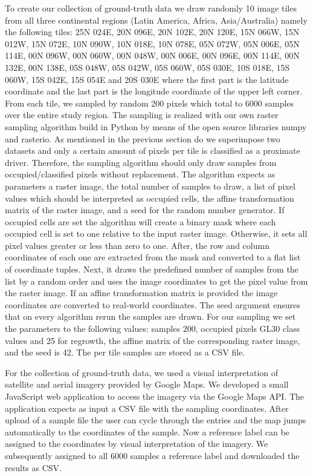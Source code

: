 			To create our collection of ground-truth data we draw randomly 10 image tiles from all three continental regions (Latin America, Africa, Asia/Australia) namely the following tiles: 25N 024E, 20N 096E, 20N 102E, 20N 120E, 15N 066W, 15N 012W, 15N 072E, 10N 090W, 10N 018E, 10N 078E, 05N 072W, 05N 006E, 05N 114E, 00N 096W, 00N 060W, 00N 048W, 00N 006E, 00N 096E, 00N 114E, 00N 132E, 00N 138E, 05S 048W, 05S 042W, 05S 060W, 05S 030E, 10S 018E, 15S 060W, 15S 042E, 15S 054E and 20S 030E where the first part is the latitude coordinate and the last part is the longitude coordinate of the upper left corner. From each tile, we sampled by random 200 pixels which total to 6000 samples over the entire study region. The sampling is realized with our own raster sampling algorithm build in Python by means of the open source libraries numpy and rasterio. As mentioned in the previous section do we superimpose two datasets and only a certain amount of pixels per tile is classified as a proximate driver. Therefore, the sampling algorithm should only draw samples from occupied/classified pixels without replacement. The algorithm expects as parameters a raster image, the total number of samples to draw, a list of pixel values which should be interpreted as occupied cells, the affine transformation matrix of the raster image, and a seed for the random number generator. If occupied cells are set the algorithm will create a binary mask where each occupied cell is set to one relative to the input raster image. Otherwise, it sets all pixel values greater or less than zero to one. After, the row and column coordinates of each one are extracted from the mask and converted to a flat list of coordinate tuples. Next, it draws the predefined number of samples from the list by a random order and uses the image coordinates to get the pixel value from the raster image. If an affine transformation matrix is provided the image coordinates are converted to real-world coordinates. The seed argument ensures that on every algorithm rerun the samples are drawn. For our sampling we set the parameters to the following values: samples 200, occupied pixels \ac{GL30} class values and 25 for regrowth, the affine matrix of the corresponding raster image, and the seed is 42. The per tile samples are stored as a \ac{CSV} file.

			For the collection of ground-truth data, we used a visual interpretation of satellite and aerial imagery provided by Google Maps. We developed a small JavaScript web application to access the imagery via the Google Maps \ac{API}. The application expects as input a \ac{CSV} file with the sampling coordinates. After upload of a sample file the user can cycle through the entries and the map jumps automatically to the coordinates of the sample. Now a reference label can be assigned to the coordinates by visual interpretation of the imagery. We subsequently assigned to all 6000 samples a reference label and downloaded the results as \ac{CSV}.


